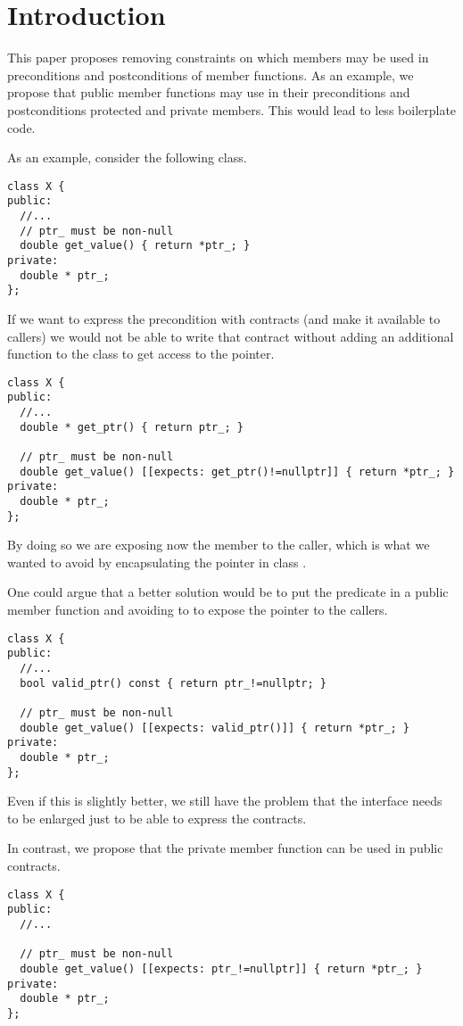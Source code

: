 \section{Introduction}

This paper proposes removing constraints on which members may be used in
preconditions and postconditions of member functions. As an example, we propose
that public member functions may use in their preconditions and postconditions
protected and private members. This would lead to less boilerplate code.

As an example, consider the following class.

\begin{lstlisting}
class X {
public:
  //...
  // ptr_ must be non-null
  double get_value() { return *ptr_; }
private:
  double * ptr_; 
};
\end{lstlisting}

If we want to express the precondition with contracts (and make it available to
callers) we would not be able to write that contract without adding an
additional function to the class to get access to the pointer.

\begin{lstlisting}
class X {
public:
  //...
  double * get_ptr() { return ptr_; }

  // ptr_ must be non-null
  double get_value() [[expects: get_ptr()!=nullptr]] { return *ptr_; }
private:
  double * ptr_; 
};
\end{lstlisting}

By doing so we are exposing now the  member to the caller, which is what we
wanted to avoid by encapsulating the pointer in class .

One could argue that a better solution would be to put the predicate in a public
member function and avoiding to to expose the pointer to the callers.

\begin{lstlisting}
class X {
public:
  //...
  bool valid_ptr() const { return ptr_!=nullptr; }

  // ptr_ must be non-null
  double get_value() [[expects: valid_ptr()]] { return *ptr_; }
private:
  double * ptr_; 
};
\end{lstlisting}

Even if this is slightly better, we still have the problem that the interface
needs to be enlarged just to be able to express the contracts.

In contrast, we propose that the private member function can be used in public
contracts.

\begin{lstlisting}
class X {
public:
  //...

  // ptr_ must be non-null
  double get_value() [[expects: ptr_!=nullptr]] { return *ptr_; }
private:
  double * ptr_; 
};
\end{lstlisting}

